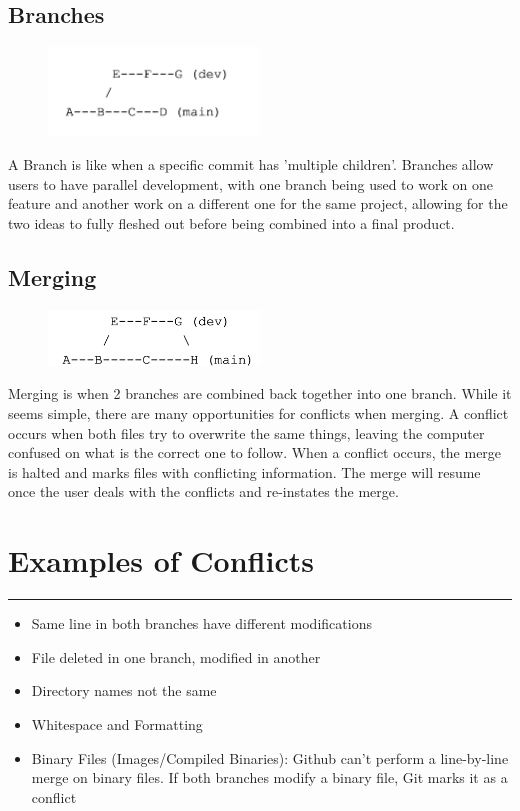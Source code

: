 \documentclass{article}
\begin{document}
\subsection*{Branches}
\begin{figure}[h]
    \centering
    \includegraphics[width=0.5\textwidth]{branch.png}
\end{figure}
A Branch is like when a specific commit has 'multiple children'. Branches allow users to have parallel development, with one branch being used to work on one feature and another work on a different one for the same project, allowing for the two ideas to fully fleshed out before being combined into a final product.
\subsection*{Merging}
\begin{figure}[h]
    \centering
    \includegraphics[width=0.5\textwidth]{Merge.png}
\end{figure}
Merging is when 2 branches are combined back together into one branch. While it seems simple, there are many opportunities for conflicts when merging. A conflict occurs when both files try to overwrite the same things, leaving the computer confused on what is the correct one to follow. When a conflict occurs, the merge is halted and marks files with conflicting information. The merge will resume once the user deals with the conflicts and re-instates the merge. 
\vspace{45pt}

\section*{Examples of Conflicts}
\hrule
\vspace{15pt}
\begin{itemize}
    \item Same line in both branches have different modifications
    \item File deleted in one branch, modified in another
    \item Directory names not the same
    \item Whitespace and Formatting
    \item Binary Files (Images/Compiled Binaries): Github can't perform a line-by-line merge on binary files. If both branches modify a binary file, Git marks it as a conflict 
\end{itemize}
\end{document}
